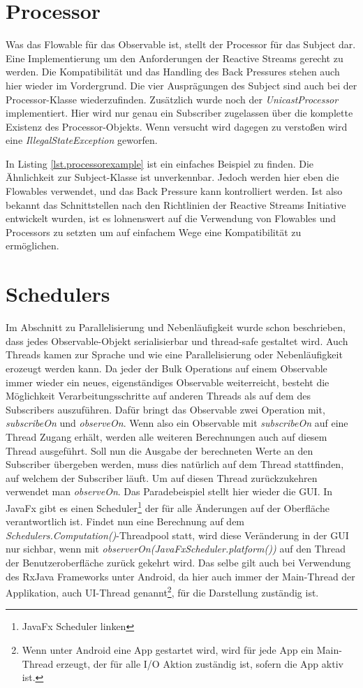 \section{Processor}
Was das Flowable für das Observable ist, stellt der Processor für das Subject dar. Eine Implementierung um den Anforderungen der Reactive Streams gerecht zu werden. Die Kompatibilität und das Handling des Back Pressures stehen auch hier wieder im Vordergrund. Die vier Ausprägungen des Subject sind auch bei der Processor-Klasse wiederzufinden. Zusätzlich wurde noch der \textit{UnicastProcessor} implementiert. Hier wird nur genau ein Subscriber zugelassen über die komplette Existenz des Processor-Objekts. Wenn versucht wird dagegen zu verstoßen wird eine \textit{IllegalStateException} geworfen.

In Listing \ref{lst.processorexample} ist ein einfaches Beispiel zu finden. Die Ähnlichkeit zur Subject-Klasse ist unverkennbar. Jedoch werden hier eben die Flowables verwendet, und das Back Pressure kann kontrolliert werden. Ist also bekannt das Schnittstellen nach den Richtlinien der Reactive Streams Initiative entwickelt wurden, ist es lohnenswert auf die Verwendung von Flowables und Processors zu setzten um auf einfachem Wege eine Kompatibilität zu ermöglichen.
\section{Schedulers}
Im Abschnitt zu Parallelisierung und Nebenläufigkeit wurde schon beschrieben, dass jedes Observable-Objekt serialisierbar und thread-safe gestaltet wird. Auch Threads kamen zur Sprache und wie eine Parallelisierung oder Nebenläufigkeit erozeugt werden kann. Da jeder der Bulk Operations auf einem Observable immer wieder ein neues, eigenständiges Observable weiterreicht, besteht die Möglichkeit Verarbeitungsschritte auf anderen Threads als auf dem des Subscribers auszuführen. Dafür bringt das Observable zwei Operation mit, \textit{subscribeOn} und \textit{observeOn}. Wenn also ein Observable mit \textit{subscribeOn} auf eine Thread Zugang erhält, werden alle weiteren Berechnungen auch auf diesem Thread ausgeführt. Soll nun die Ausgabe der berechneten Werte an den Subscriber übergeben werden, muss dies natürlich auf dem Thread stattfinden, auf welchem der Subscriber läuft. Um auf diesen Thread zurückzukehren verwendet man \textit{observeOn}. Das Paradebeispiel stellt hier wieder die GUI. In JavaFx gibt es einen Scheduler\footnote{JavaFx Scheduler linken} der für alle Änderungen auf der Oberfläche verantwortlich ist. Findet nun eine Berechnung auf dem \textit{Schedulers.Computation()}-Threadpool statt, wird diese Veränderung in der GUI nur sichbar, wenn mit \textit{observerOn(JavaFxScheduler.platform())} auf den Thread der Benutzeroberfläche zurück gekehrt wird. Das selbe gilt auch bei Verwendung des RxJava Frameworks unter Android, da hier auch immer der Main-Thread der Applikation, auch UI-Thread genannt\footnote{Wenn unter Android eine App gestartet wird, wird für jede App ein Main-Thread erzeugt, der für alle I/O Aktion zuständig ist, sofern die App aktiv ist.}, für die Darstellung zuständig ist.
